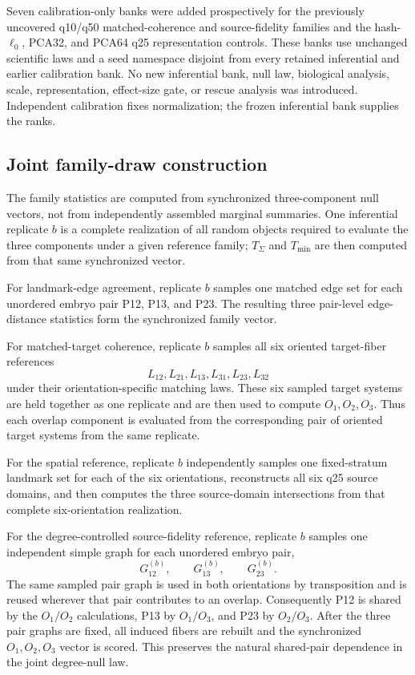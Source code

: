 \documentclass[11pt]{article}
\begin{document}
Seven calibration-only banks were added prospectively for the previously uncovered q10/q50 matched-coherence and source-fidelity families and the hash-\(\ell_0\), PCA32, and PCA64 q25 representation controls. These banks use unchanged scientific laws and a seed namespace disjoint from every retained inferential and earlier calibration bank. No new inferential bank, null law, biological analysis, scale, representation, effect-size gate, or rescue analysis was introduced. Independent calibration fixes normalization; the frozen inferential bank supplies the ranks.
\subsection{Joint family-draw construction}

The family statistics are computed from synchronized three-component null vectors, not from independently assembled marginal summaries. One inferential replicate \(b\) is a complete realization of all random objects required to evaluate the three components under a given reference family; \(T_\Sigma\) and \(T_{\min}\) are then computed from that same synchronized vector.

For landmark-edge agreement, replicate \(b\) samples one matched edge set for each unordered embryo pair P12, P13, and P23. The resulting three pair-level edge-distance statistics form the synchronized family vector.

For matched-target coherence, replicate \(b\) samples all six oriented target-fiber references
\[
L_{12},L_{21},L_{13},L_{31},L_{23},L_{32}
\]
under their orientation-specific matching laws. These six sampled target systems are held together as one replicate and are then used to compute \(O_1,O_2,O_3\). Thus each overlap component is evaluated from the corresponding pair of oriented target systems from the same replicate.

For the spatial reference, replicate \(b\) independently samples one fixed-stratum landmark set for each of the six orientations, reconstructs all six q25 source domains, and then computes the three source-domain intersections from that complete six-orientation realization.

For the degree-controlled source-fidelity reference, replicate \(b\) samples one independent simple graph for each unordered embryo pair,
\[
G_{12}^{(b)},\qquad G_{13}^{(b)},\qquad G_{23}^{(b)}.
\]
The same sampled pair graph is used in both orientations by transposition and is reused wherever that pair contributes to an overlap. Consequently P12 is shared by the \(O_1/O_2\) calculations, P13 by \(O_1/O_3\), and P23 by \(O_2/O_3\). After the three pair graphs are fixed, all induced fibers are rebuilt and the synchronized \(O_1,O_2,O_3\) vector is scored. This preserves the natural shared-pair dependence in the joint degree-null law.
\end{document}
